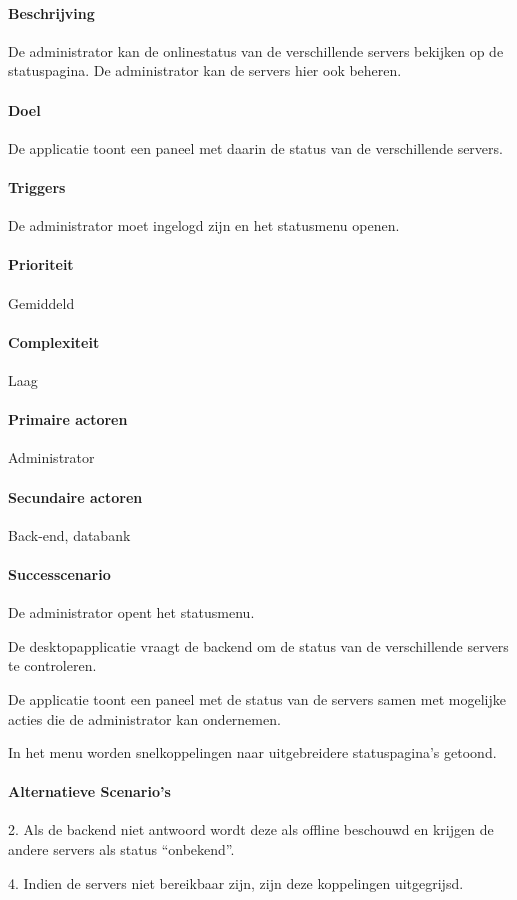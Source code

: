 \begin{compact}
\paragraph{Beschrijving} De administrator kan de onlinestatus van de verschillende servers bekijken op de statuspagina. De administrator kan de servers hier ook beheren.
\paragraph{Doel} De applicatie toont een paneel met daarin de status van de verschillende servers.
\paragraph{Triggers}De administrator moet ingelogd zijn en het statusmenu openen.
\paragraph{Prioriteit}Gemiddeld
\paragraph{Complexiteit}Laag
\paragraph{Primaire actoren}Administrator
\paragraph{Secundaire actoren}Back-end, databank
\paragraph{Successcenario}
\begin{enumerate_compact}
 \item De administrator opent het statusmenu.
 \item De desktopapplicatie vraagt de backend om de status van de verschillende servers te controleren.
 \item De applicatie toont een paneel met de status van de servers samen met mogelijke acties die de administrator kan ondernemen.
 \item In het menu worden snelkoppelingen naar uitgebreidere statuspagina's getoond.
\end{enumerate_compact}
\paragraph{Alternatieve Scenario's}
\begin{enumerate_compact}
	\item[2.] Als de backend niet antwoord wordt deze als offline beschouwd en krijgen de andere servers als status ``onbekend''.
	\item[4.] Indien de servers niet bereikbaar zijn, zijn deze koppelingen uitgegrijsd.
\end{enumerate_compact}
\end{compact}

